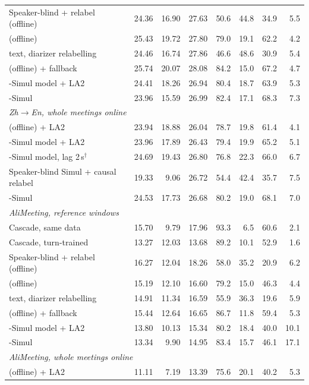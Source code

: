 \begin{table}[t]
\begin{tabular}{lrrrrrrr}
Speaker-blind + relabel (offline) & 24.36 & 16.90 & 27.63 & 50.6 & 44.8 & 34.9 & 5.5 \\
\sys{} (offline) & 25.43 & 19.72 & 27.80 & 79.0 & 19.1 & 62.2 & 4.2 \\
\sys{} text, diarizer relabelling & 24.46 & 16.74 & 27.86 & 46.6 & 48.6 & 30.9 & 5.4 \\
\sys{} (offline) + fallback & 25.74 & 20.07 & 28.08 & 84.2 & 15.0 & 67.2 & 4.7 \\
\sys{}-Simul model + LA2 & 24.41 & 18.26 & 26.94 & 80.4 & 18.7 & 63.9 & 5.3 \\
\sys{}-Simul & 23.96 & 15.59 & 26.99 & 82.4 & 17.1 & 68.3 & 7.3 \\
\multicolumn{8}{l}{\emph{Zh$\rightarrow$En, whole meetings online}} \\
\sys{} (offline) + LA2 & 23.94 & 18.88 & 26.04 & 78.7 & 19.8 & 61.4 & 4.1 \\
\sys{}-Simul model + LA2 & 23.96 & 17.89 & 26.43 & 79.4 & 19.9 & 65.2 & 5.1 \\
\sys{}-Simul model, lag 2\,s$^\dagger$ & 24.69 & 19.43 & 26.80 & 76.8 & 22.3 & 66.0 & 6.7 \\
Speaker-blind Simul + causal relabel & 19.33 & 9.06 & 26.72 & 54.4 & 42.4 & 35.7 & 7.5 \\
\sys{}-Simul & 24.53 & 17.73 & 26.68 & 80.2 & 19.0 & 68.1 & 7.0 \\
\multicolumn{8}{l}{\emph{AliMeeting, reference windows}} \\
Cascade, same data & 15.70 & 9.79 & 17.96 & 93.3 & 6.5 & 60.6 & 2.1 \\
Cascade, turn-trained & 13.27 & 12.03 & 13.68 & 89.2 & 10.1 & 52.9 & 1.6 \\
Speaker-blind + relabel (offline) & 16.27 & 12.04 & 18.26 & 58.0 & 35.2 & 20.9 & 6.2 \\
\sys{} (offline) & 15.19 & 12.10 & 16.60 & 79.2 & 15.0 & 46.3 & 4.4 \\
\sys{} text, diarizer relabelling & 14.91 & 11.34 & 16.59 & 55.9 & 36.3 & 19.6 & 5.9 \\
\sys{} (offline) + fallback & 15.44 & 12.64 & 16.65 & 86.7 & 11.8 & 59.4 & 5.3 \\
\sys{}-Simul model + LA2 & 13.80 & 10.13 & 15.34 & 80.2 & 18.4 & 40.0 & 10.1 \\
\sys{}-Simul & 13.34 & 9.90 & 14.95 & 83.4 & 15.7 & 46.1 & 17.1 \\
\multicolumn{8}{l}{\emph{AliMeeting, whole meetings online}} \\
\sys{} (offline) + LA2 & 11.11 & 7.19 & 13.39 & 75.6 & 20.1 & 40.2 & 5.3 \\

\end{tabular}
\end{table}
